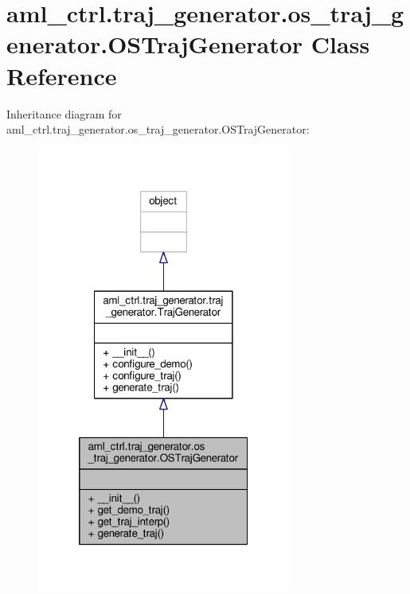 \hypertarget{classaml__ctrl_1_1traj__generator_1_1os__traj__generator_1_1_o_s_traj_generator}{\section{aml\-\_\-ctrl.\-traj\-\_\-generator.\-os\-\_\-traj\-\_\-generator.\-O\-S\-Traj\-Generator Class Reference}
\label{classaml__ctrl_1_1traj__generator_1_1os__traj__generator_1_1_o_s_traj_generator}
}


Inheritance diagram for aml\-\_\-ctrl.\-traj\-\_\-generator.\-os\-\_\-traj\-\_\-generator.\-O\-S\-Traj\-Generator\-:
\nopagebreak
\begin{figure}[H]
\begin{center}
\leavevmode
\includegraphics[width=236pt]{classaml__ctrl_1_1traj__generator_1_1os__traj__generator_1_1_o_s_traj_generator__inherit__graph}
\end{center}
\end{figure}


